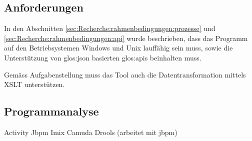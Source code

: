\subsection{Anforderungen}
In den Abschnitten \cref{sec:Recherche:rahmenbedingungen:prozesse}  und \cref{sec:Recherche:rahmenbedingungen:api}  wurde beschrieben, dass das Programm auf den Betriebsystemen Windows und Unix lauffähig sein muss, sowie die Unterstützung von \Gls{glos:json} basierten \Glspl{glos:api} beinhalten muss.

Gemäss Aufgabenstellung muss das Tool auch die Datentransformation mittels XSLT unterstützen.

\subsection{Programmanalyse}
Activity
Jbpm
Imix
Camuda
Drools (arbeitet mit jbpm)